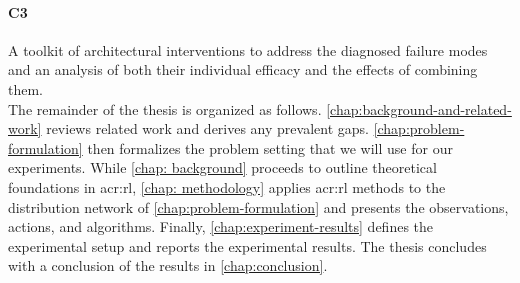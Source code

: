 \vspace{-0.7\baselineskip}
\paragraph{\textbf{C3}} A toolkit of architectural interventions to address the diagnosed failure modes and an analysis of both their individual efficacy and the effects of combining them.\\

The remainder of the thesis is organized as follows. \autoref{chap:background-and-related-work} reviews related work and derives any prevalent gaps. \autoref{chap:problem-formulation} then formalizes the problem setting that we will use for our experiments. While \autoref{chap: background} proceeds to outline theoretical foundations in \gls{acr:rl}, \autoref{chap: methodology} applies \gls{acr:rl} methods to the distribution network of \autoref{chap:problem-formulation} and presents the observations, actions, and algorithms.  Finally, \autoref{chap:experiment-results} defines the experimental setup and reports the experimental results. The thesis concludes with a conclusion of the results in \autoref{chap:conclusion}.



